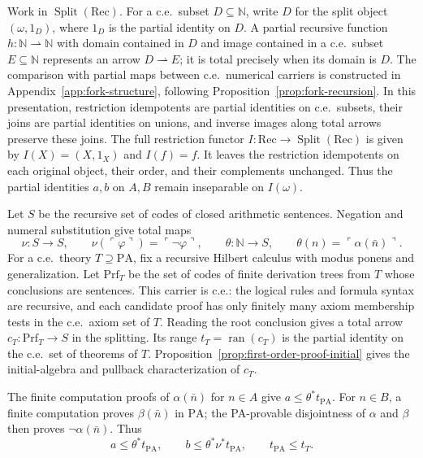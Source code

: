 \documentclass[11pt]{article}
\newcommand{\N}{\mathbb N}
\newcommand{\PA}{\mathrm{PA}}
\newcommand{\ran}{\operatorname{ran}}
\begin{document}
Work in $\operatorname{Split}(\mathrm{Rec})$.
For a c.e.\ subset $D\subseteq\N$, write $D$ for the split object
$(\omega,1_D)$, where $1_D$ is the partial identity on $D$.
A partial recursive function $h:\N\rightharpoonup\N$ with domain
contained in $D$ and image contained in a c.e.\ subset $E\subseteq\N$
represents an arrow
$D\rightharpoonup E$; it is total precisely when its domain is $D$.
The comparison with partial maps between c.e.\ numerical carriers
is constructed in Appendix~\ref{app:fork-structure}, following
Proposition~\ref{prop:fork-recursion}.
In this presentation, restriction idempotents are partial identities
on c.e.\ subsets, their joins are partial identities on unions, and inverse images along
total arrows preserve these joins.
The full restriction functor
$I:\mathrm{Rec}\to\operatorname{Split}(\mathrm{Rec})$ is given by
$I(X)=(X,1_X)$ and $I(f)=f$. It leaves the restriction idempotents
on each original object, their order, and their complements unchanged.
Thus the partial identities $a,b$ on $A,B$ remain inseparable
on $I(\omega)$.

Let $S$ be the recursive set of codes of closed arithmetic sentences.
Negation and numeral substitution give total maps
\[
 \nu:S\to S,\qquad \nu(\ulcorner\varphi\urcorner)
     =\ulcorner\neg\varphi\urcorner,
 \qquad
 \theta:\N\to S,\qquad \theta(n)=\ulcorner\alpha(\bar n)\urcorner.
\]
For a c.e.\ theory $T\supseteq\PA$, fix a recursive Hilbert calculus
with modus ponens and generalization. Let $\mathrm{Prf}_T$ be the
set of codes of finite derivation trees from $T$ whose conclusions are sentences.
This carrier is c.e.: the logical rules and formula syntax are
recursive, and each candidate proof has only finitely many axiom
membership tests in the c.e.\ axiom set of $T$. Reading the root
conclusion gives a total arrow
$c_T:\mathrm{Prf}_T\to S$ in the splitting. Its range
$t_T=\ran(c_T)$ is the partial identity on the c.e.\ set of theorems
of $T$.
Proposition~\ref{prop:first-order-proof-initial} gives the initial-algebra
and pullback characterization of $c_T$.

The finite computation proofs of $\alpha(\bar n)$ for $n\in A$ give
$a\le\theta^*t_{\PA}$. For $n\in B$, a finite computation proves
$\beta(\bar n)$ in $\PA$; the PA-provable disjointness of $\alpha$
and $\beta$ then proves $\neg\alpha(\bar n)$. Thus
\begin{equation}\label{eq:arithmetic-domain-inclusions}
 a\le\theta^*t_{\PA},\qquad
 b\le\theta^*\nu^*t_{\PA},\qquad
 t_{\PA}\le t_T.
\end{equation}
\end{document}
